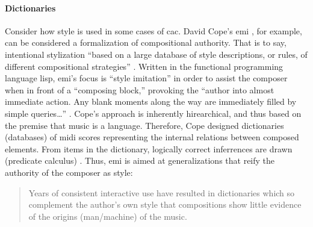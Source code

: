 
\paragraph{Dictionaries}
Consider how style is used in some cases of \gls{cac}. David Cope's \gls{emi} \parencite{DBLP:conf/icmc/Cope87}, for example, can be considered a formalization of compositional authority. That is to say, intentional stylization ``based on a large database of style descriptions, or rules, of different compositional strategies'' \parencite[3]{Mau99:Abr}. Written in the functional programming language \gls{lisp}, \gls{emi}'s focus is ``style imitation'' in order to assist the composer when in front of a ``composing block,'' provoking the ``author into almost immediate action. Any blank moments along the way are immediately filled by simple queries\dots'' \parencite[38]{Cop87:AnE}. Cope's approach is inherently hirearchical, and thus based on the premise that music is a language. Therefore, Cope designed dictionaries (databases) of \gls{midi} scores representing the internal relations between composed elements. From items in the dictionary, logically correct inferrences are drawn (predicate calculus) \parencite[1]{DBLP:conf/icmc/Cope87}. Thus, \gls{emi} is aimed at generalizations that reify the authority of the composer as style: 

\begin{quote}
	Years of consistent interactive use have resulted in dictionaries which so complement the author's own style that compositions show little evidence of the origins (man/machine) of the music. \parencite[179]{DBLP:conf/icmc/Cope87}
\end{quote}





